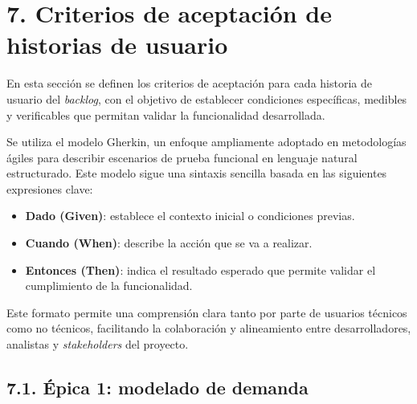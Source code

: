 \documentclass[
11pt, %
]{charter}
\begin{document}
\section{7. Criterios de aceptación de historias de usuario}
\label{sec:criteriosAceptacion}

En esta sección se definen los criterios de aceptación para cada historia de usuario del \textit{backlog}, con el objetivo de establecer condiciones específicas, medibles y verificables que permitan validar la funcionalidad desarrollada. 

Se utiliza el modelo Gherkin, un enfoque ampliamente adoptado en metodologías ágiles para describir escenarios de prueba funcional en lenguaje natural estructurado. Este modelo sigue una sintaxis sencilla basada en las siguientes expresiones clave:

\begin{itemize}
  \item \textbf{Dado (Given)}: establece el contexto inicial o condiciones previas.
  \item \textbf{Cuando (When)}: describe la acción que se va a realizar.
  \item \textbf{Entonces (Then)}: indica el resultado esperado que permite validar el cumplimiento de la funcionalidad.
\end{itemize}

Este formato permite una comprensión clara tanto por parte de usuarios técnicos como no técnicos, facilitando la colaboración y alineamiento entre desarrolladores, analistas y \textit{stakeholders} del proyecto.

\subsection*{7.1. Épica 1: modelado de demanda}
\end{document}

